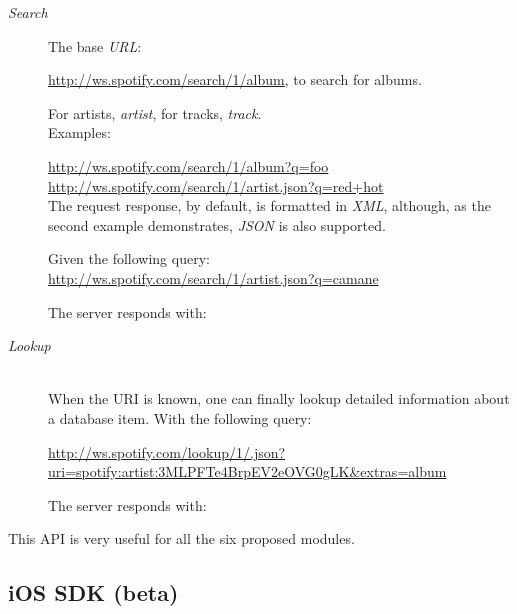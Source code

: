       \begin{description}
        \item[\emph{Search}] \hfill

          The base \emph{URL}:

          \url{http://ws.spotify.com/search/1/album}, to search for albums.

          For artists, \emph{artist}, for tracks, \emph{track}. \\

          Examples:

          \url{http://ws.spotify.com/search/1/album?q=foo} \\
          \url{http://ws.spotify.com/search/1/artist.json?q=red+hot} \\

          The request response, by default, is formatted in \emph{XML}, although, as the second example demonstrates, \emph{JSON} is also supported.

          Given the following query: \\
          \url{http://ws.spotify.com/search/1/artist.json?q=camane}

          The server responds with:

          

        \item[\emph{Lookup}] \hfill \\

          When the URI is known, one can finally lookup detailed information about a database item. With the following query:

          \sloppy
          \url{http://ws.spotify.com/lookup/1/.json?uri=spotify:artist:3MLPFTe4BrpEV2eOVG0gLK&extras=album}

          The server responds with:

          

      \end{description}

      This API is very useful for all the six proposed modules.


    \subsection{iOS SDK (beta)} %
    \label{sub:ios_sdk}
    
